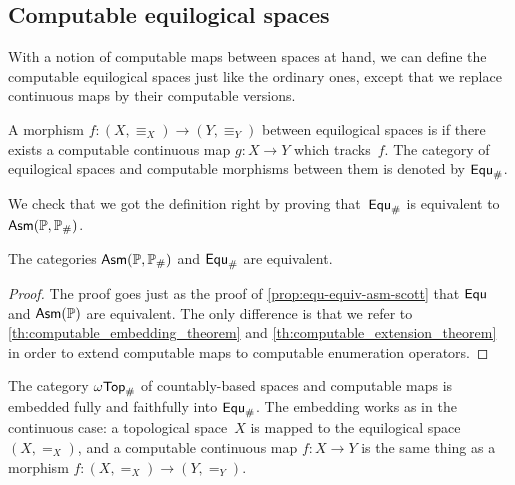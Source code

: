 
\subsection{Computable equilogical spaces}
\label{sec:computable-equ}


With a notion of computable maps between spaces at hand, we can define
the computable equilogical spaces just like the ordinary ones, except
that we replace continuous maps by their computable versions.

\begin{definition}
  \label{def:computable-equ}%
  A morphism $f : (X, {\equiv_X}) \to (Y, {\equiv_Y})$ between
  equilogical spaces is  if there exists a computable
  continuous map $g : X \to Y$ which tracks~$f$.
  The category of equilogical spaces and computable morphisms between
  them is denoted by $\mathsf{Equ}_{\#}$.
\end{definition}

We check that we got the definition right by proving
that~$\mathsf{Equ}_{\#}$ is equivalent to $\mathsf{Asm}(\mathbb{P}, \mathbb{P}_{\#})$.

\begin{proposition}
  \label{th:equivalence_compEqu_AsmScott}%
  The categories $\mathsf{Asm}(\mathbb{P}, \mathbb{P}_{\#})$ and $\mathsf{Equ}_{\#}$ are
  equivalent.
\end{proposition}

\begin{proof}
  The proof goes just as the proof of
  \cref{prop:equ-equiv-asm-scott} that $\mathsf{Equ}$ and
  $\mathsf{Asm}(\mathbb{P})$ are equivalent. The only difference is that we refer
  to \cref{th:computable_embedding_theorem} and \cref{th:computable_extension_theorem} in order to
  extend computable maps to computable enumeration operators.
\end{proof}

The category $\mathsf{\omega Top}_{\#}$ of countably-based spaces and computable
maps is embedded fully and faithfully into $\mathsf{Equ}_{\#}$. The
embedding works as in the continuous case: a topological space~$X$ is
mapped to the equilogical space $(X, {=_X})$, and a computable
continuous map $f : X \to Y$ is the same thing as a morphism $f : (X,
{=_X}) \to (Y, {=_Y})$.


